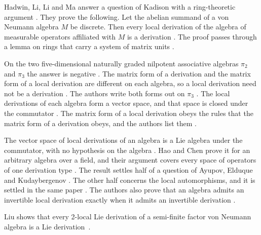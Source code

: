 Hadwin, Li, Li and Ma answer a question of Kadison with a ring-theoretic
argument \cite[p.~1]{HadwinLiLiMa2013}. They prove the following. Let the abelian summand
of a von Neumann algebra $M$ be discrete. Then every local derivation of the
algebra of measurable operators affiliated with $M$ is a derivation
\cite[Theorem~1, pp.~2--3]{HadwinLiLiMa2013}. The proof passes through a lemma
on rings that carry a system of matrix units
\cite[Lemma~1, p.~1]{HadwinLiLiMa2013}.

On the two five-dimensional naturally graded nilpotent associative algebras
$\pi_2$ and $\pi_3$ the answer is negative \cite[p.~1]{ArzikulovKhakimovQurbonov2026}.
The matrix form of a derivation and the matrix form of a local derivation are
different on each algebra, so a local derivation need not be a derivation
\cite[p.~1]{ArzikulovKhakimovQurbonov2026}. The authors write both forms out on
$\pi_3$ \cite[Theorems~8 and~9, pp.~14--15]{ArzikulovKhakimovQurbonov2026}. The local
derivations of each algebra form a vector space, and that space is closed under
the commutator \cite[Theorems~10 and~11, p.~15]{ArzikulovKhakimovQurbonov2026}.
The matrix form of a local derivation obeys the rules that the matrix form of a
derivation obeys, and the authors list them
\cite[Theorem~5, pp.~10--11]{ArzikulovKhakimovQurbonov2026}.

The vector space of local derivations of an algebra is a Lie algebra under the
commutator, with no hypothesis on the algebra
\cite[Theorem~2.8, p.~4]{HaoChen2026Local}. Hao and Chen prove it for an
arbitrary algebra over a field, and their argument covers every space of
operators of one derivation type \cite[p.~4]{HaoChen2026Local}. The result
settles half of a question of Ayupov, Elduque and Kudaybergenov
\cite[p.~1]{HaoChen2026Local}. The other half concerns the local
automorphisms, and it is settled in the same paper
\cite[p.~1]{HaoChen2026Local}. The authors also prove that an algebra admits
an invertible local derivation exactly when it admits an invertible derivation
\cite[Theorem~2.18, p.~7]{HaoChen2026Local}.


Liu shows that every 2-local Lie derivation of a semi-finite factor von Neumann algebra is a Lie derivation~\cite{WlW2LocalLieDerivationsOnSemiFini2016}.

